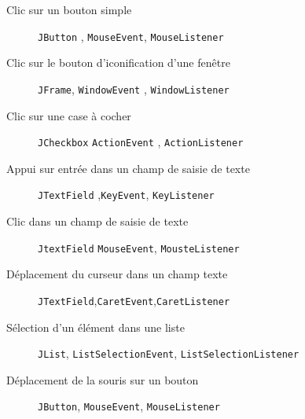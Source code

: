 \documentclass[12pt,a4paper,openany]{book}
\begin{document}
	\begin{description}
		\item[Clic sur un bouton simple] \texttt{JButton} , \texttt{MouseEvent}, \texttt{MouseListener}
		\item[Clic sur le bouton d'iconification d'une fenêtre] \texttt{JFrame}, \texttt{WindowEvent} , \texttt{WindowListener}
		\item[Clic sur une case à cocher] \texttt{JCheckbox} \texttt{ActionEvent} , \texttt{ActionListener}
		\item[Appui sur entrée dans un champ de saisie de texte]\texttt{JTextField} ,\texttt{KeyEvent}, \texttt{KeyListener}
		\item[Clic dans un champ de saisie de texte]\texttt{JtextField} \texttt{MouseEvent}, \texttt{MousteListener}

		\item[Déplacement du curseur dans un champ texte] \texttt{JTextField},\texttt{CaretEvent},\texttt{CaretListener}
		\item[Sélection d'un élément dans une liste]\texttt{JList}, \texttt{ListSelectionEvent}, \texttt{ListSelectionListener}
	\item[Déplacement de la souris sur un bouton] \texttt{JButton}, \texttt{MouseEvent}, \texttt{MouseListener}
	\end{description}
\end{document}
